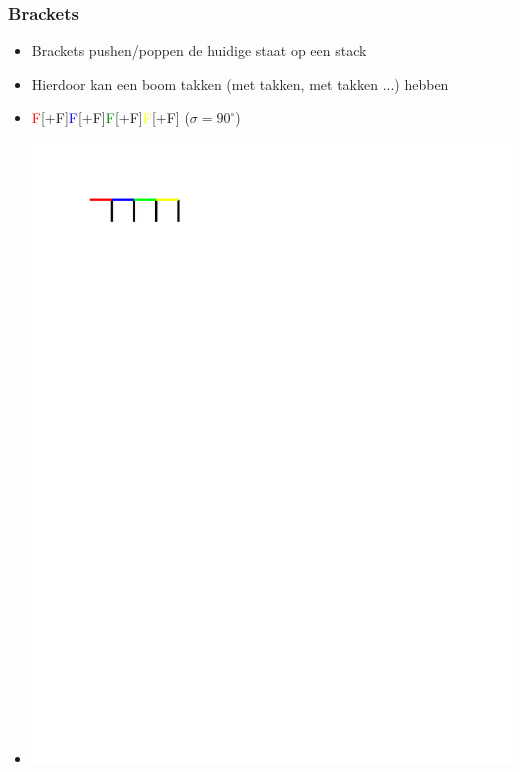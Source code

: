\documentclass[ignorenonframetext,compress]{beamer}
\begin{document}
\begin{frame}[fragile]
	\frametitle{Brackets}
\begin{itemize}
\item Brackets pushen/poppen de huidige staat op een stack
\item Hierdoor kan een boom takken (met takken, met takken ...) hebben
\pause
\item \textcolor{red}{F}[+F]\textcolor{blue}{F}[+F]\textcolor{green}{F}[+F]\textcolor{yellow}{F}[+F] ($\sigma = 90^{\circ}$)
\item \includegraphics[trim = 24mm 00mm 0mm 24mm, clip]{brackets.pdf}
\end{itemize}
\end{frame}
\end{document}
